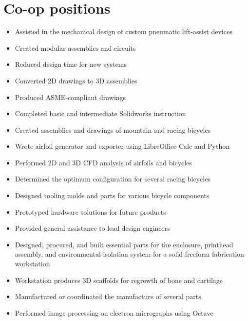 \documentclass[<< theme.font_size >>]{moderncv}
\begin{document}
\section{Co-op positions}
%
    {
        \begin{itemize}
          \item Assisted in the mechanical design of custom pneumatic lift-assist devices
          \item Created modular assemblies and circuits
          \item Reduced design time for new systems
          \item Converted 2D drawings to 3D assemblies
          \item Produced ASME-compliant drawings
        \end{itemize}
    }
%
    {
        \begin{itemize}
          \item Completed basic and intermediate Solidworks instruction
          \item Created assemblies and drawings of mountain and racing bicycles
          \item Wrote airfoil generator and exporter using LibreOffice Calc and Python
          \item Performed 2D and 3D CFD analysis of airfoils and bicycles
          \item Determined the optimum configuration for several racing bicycles
          \item Designed tooling molds and parts for various bicycle components
        \end{itemize}
    }
%
    {
        \begin{itemize}
          \item Prototyped hardware solutions for future products
          \item Provided general assistance to lead design engineers
        \end{itemize}
    }
%
    {
        \begin{itemize}
          \item Designed, procured, and built essential parts for the enclosure, printhead assembly, and environmental isolation system for a solid freeform fabrication workstation
          \item Workstation produces 3D scaffolds for regrowth of bone and cartilage
          \item Manufactured or coordinated the manufacture of several parts
          \item Performed image processing on electron micrographs using Octave
        \end{itemize}
    }
\end{document}
